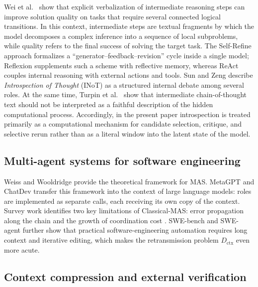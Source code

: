 Wei et al.~\cite{wei2022cot} show that explicit verbalization of intermediate reasoning steps can improve solution quality on tasks that require several connected logical transitions. In this context, intermediate steps are textual fragments by which the model decomposes a complex inference into a sequence of local subproblems, while quality refers to the final success of solving the target task. The \textrm{Self-Refine} approach \cite{madaan2023selfrefine} formalizes a ``generator--feedback--revision'' cycle inside a single model; \textrm{Reflexion} \cite{shinn2023reflexion} supplements such a scheme with reflective memory, whereas \textrm{ReAct} \cite{yao2022react} couples internal reasoning with external actions and tools. Sun and Zeng \cite{sun2025inot} describe \textit{Introspection of Thought} (INoT) as a structured internal debate among several roles. At the same time, Turpin et al.~\cite{turpin2023unfaithful} show that intermediate chain-of-thought text should not be interpreted as a faithful description of the hidden computational process. Accordingly, in the present paper introspection is treated primarily as a computational mechanism for candidate selection, critique, and selective rerun rather than as a literal window into the latent state of the model.

\subsection{Multi-agent systems for software engineering}

Weiss \cite{weiss1999} and Wooldridge \cite{wooldridge2009} provide the theoretical framework for MAS. MetaGPT \cite{hong2023metagpt} and ChatDev \cite{qian2023chatdev} transfer this framework into the context of large language models: roles are implemented as separate calls, each receiving its own copy of the context. Survey work identifies two key limitations of Classical-MAS: error propagation along the chain and the growth of coordination cost \cite{guo2024survey,qian2024scaling}. SWE-bench and SWE-agent \cite{jimenez2023swebench,yang2024sweagent} further show that practical software-engineering automation requires long context and iterative editing, which makes the retransmission problem $D_{\text{ctx}}$ even more acute.

\subsection{Context compression and external verification}

